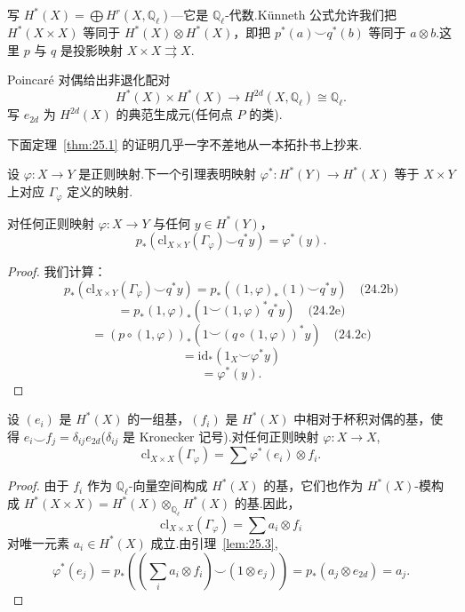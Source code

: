 写 $H^{*}(X) = \bigoplus H^{r}(X, \mathbb{Q}_{\ell})$---它是 $\mathbb{Q}_{\ell}$-代数.K\"unneth 公式允许我们把 $H^{*}(X \times X)$ 等同于 $H^{*}(X) \otimes H^{*}(X)$，即把 $p^{*}(a) \smile q^{*}(b)$ 等同于 $a \otimes b$.这里 $p$ 与 $q$ 是投影映射 $X \times X \rightrightarrows X$.

Poincar\'e 对偶给出非退化配对
\[
H^{*}(X) \times H^{*}(X) \to H^{2d}(X, \mathbb{Q}_{\ell}) \cong \mathbb{Q}_{\ell}.
\]
写 $e_{2d}$ 为 $H^{2d}(X)$ 的典范生成元(任何点 $P$ 的类).

下面定理~\ref{thm:25.1} 的证明几乎一字不差地从一本拓扑书上抄来.

设 $\varphi \colon X \to Y$ 是正则映射.下一个引理表明映射 $\varphi^{*} \colon H^{*}(Y) \to H^{*}(X)$ 等于 $X \times Y$ 上对应 $\Gamma_{\varphi}$ 定义的映射.

\begin{lemma}\label{lem:25.3}
对任何正则映射 $\varphi \colon X \to Y$ 与任何 $y \in H^{*}(Y)$，
\[
p_{*}(\mathrm{cl}_{X \times Y}(\Gamma_{\varphi}) \smile q^{*}y) = \varphi^{*}(y).
\]
\end{lemma}

\begin{proof}
我们计算：
\[
p_{*}(\mathrm{cl}_{X \times Y}(\Gamma_{\varphi}) \smile q^{*}y) = p_{*}((1, \varphi)_{*}(1) \smile q^{*}y) \quad \text{(24.2b)}
\]
\[
= p_{*}(1, \varphi)_{*}(1 \smile (1, \varphi)^{*}q^{*}y) \quad \text{(24.2e)}
\]
\[
= (p \circ (1, \varphi))_{*}(1 \smile (q \circ (1, \varphi))^{*}y) \quad \text{(24.2c)}
\]
\[
= \mathrm{id}_{*}(1_X \smile \varphi^{*}y)
\]
\[
= \varphi^{*}(y).
\]
\end{proof}

\begin{lemma}\label{lem:25.4}
设 $(e_i)$ 是 $H^{*}(X)$ 的一组基，$(f_i)$ 是 $H^{*}(X)$ 中相对于杯积对偶的基，使得 $e_i \smile f_j = \delta_{ij} e_{2d}$($\delta_{ij}$ 是 Kronecker 记号).对任何正则映射 $\varphi \colon X \to X$,
\[
\mathrm{cl}_{X \times X}(\Gamma_{\varphi}) = \sum \varphi^{*}(e_i) \otimes f_i.
\]
\end{lemma}

\begin{proof}
由于 $f_i$ 作为 $\mathbb{Q}_{\ell}$-向量空间构成 $H^{*}(X)$ 的基，它们也作为 $H^{*}(X)$-模构成 $H^{*}(X \times X) = H^{*}(X) \otimes_{\mathbb{Q}_{\ell}} H^{*}(X)$ 的基.因此，
\[
\mathrm{cl}_{X \times X}(\Gamma_{\varphi}) = \sum a_i \otimes f_i
\]
对唯一元素 $a_i \in H^{*}(X)$ 成立.由引理~\ref{lem:25.3},
\[
\varphi^{*}(e_j) = p_{*}\left( \left( \sum_{i} a_i \otimes f_i \right) \smile (1 \otimes e_j) \right) = p_{*}(a_j \otimes e_{2d}) = a_j.
\]
\end{proof}

